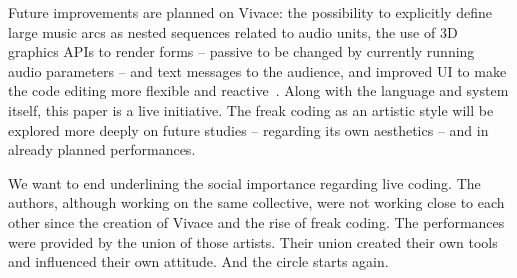 \documentclass[letterpaper, 12pt]{article}
\begin{document}
Future improvements are planned on Vivace: the possibility to
explicitly define large music arcs as nested sequences related to
audio units, the use of 3D graphics APIs to render forms -- passive to
be changed by currently running audio parameters -- and text messages
to the audience, and improved UI to make the code editing more
flexible and reactive~\citep{brett}.  Along with the language and
system itself, this paper is a live initiative. The freak coding as an
artistic style will be explored more deeply on future studies --
regarding its own aesthetics -- and in already planned performances.

We want to end underlining the social importance regarding live
coding. The authors, although working on the same collective, were not
working close to each other since the creation of Vivace and the rise
of freak coding. The performances were provided by the union of those
artists. Their union created their own tools and influenced their own
attitude. And the circle starts again.



\end{document}
